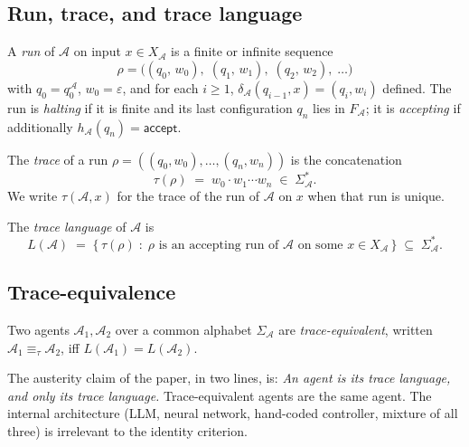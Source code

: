 \subsection{Run, trace, and trace language}

\begin{definition}[Run]
\label{def:run}
A \emph{run} of $\mathcal{A}$ on input $x\in X_\mathcal{A}$ is a
finite or infinite sequence
\[
\rho = \bigl((q_0,\, w_0),\; (q_1,\, w_1),\; (q_2,\, w_2),\;
\dots\bigr)
\]
with $q_0 = q_0^\mathcal{A}$, $w_0 = \varepsilon$, and for each
$i\ge 1$, $\delta_\mathcal{A}(q_{i-1}, x) = (q_i, w_i)$ defined.
The run is \emph{halting} if it is finite and its last
configuration $q_n$ lies in $F_\mathcal{A}$; it is
\emph{accepting} if additionally $h_\mathcal{A}(q_n) =
\textsf{accept}$.
\end{definition}

\begin{definition}[Trace]
\label{def:trace}
The \emph{trace} of a run $\rho = ((q_0,w_0),
\ldots,(q_n,w_n))$ is the concatenation
\[
\tau(\rho) \;=\; w_0 \cdot w_1 \cdots w_n \;\in\;
\Sigma_\mathcal{A}^*.
\]
We write $\tau(\mathcal{A}, x)$ for the trace of the run of
$\mathcal{A}$ on $x$ when that run is unique.
\end{definition}

\begin{definition}
\label{def:tracelang}
The \emph{trace language} of $\mathcal{A}$ is
\[
L(\mathcal{A}) \;=\;
\bigl\{\,\tau(\rho) \;:\; \rho \text{ is an accepting run of }
\mathcal{A} \text{ on some } x\in X_\mathcal{A}\,\bigr\}
\;\subseteq\; \Sigma_\mathcal{A}^*.
\]
\end{definition}

\subsection{Trace-equivalence}

\begin{definition}
\label{def:traceeq}
Two agents $\mathcal{A}_1, \mathcal{A}_2$ over a common alphabet
$\Sigma_\mathcal{A}$ are \emph{trace-equivalent}, written
$\mathcal{A}_1 \equiv_\tau \mathcal{A}_2$, iff
$L(\mathcal{A}_1) = L(\mathcal{A}_2)$.
\end{definition}

\noindent The austerity claim of the paper, in two lines, is:
\emph{An agent is its trace language, and only its trace
language.}  Trace-equivalent agents are the same agent.  The
internal architecture (LLM, neural network, hand-coded controller,
mixture of all three) is irrelevant to the identity criterion.

